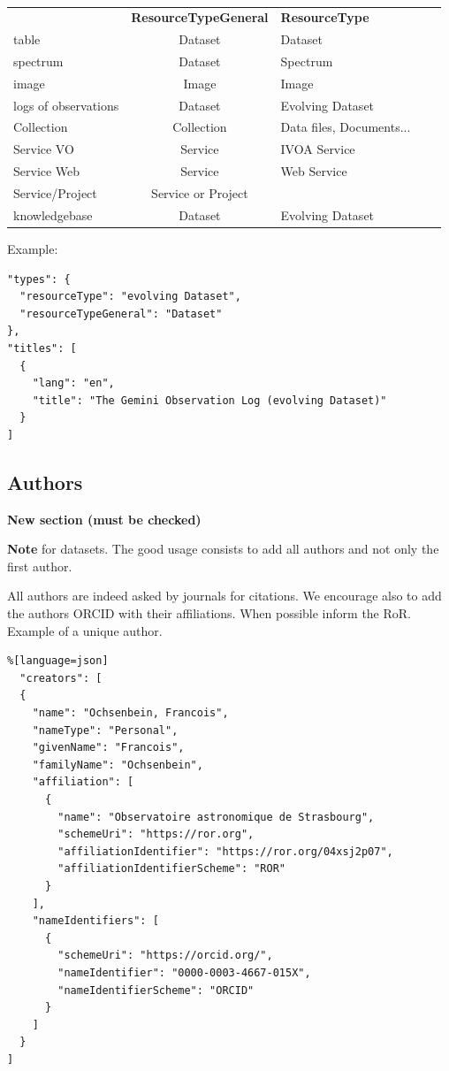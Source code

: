 \documentclass[11pt,a4paper]{ivoa}
\newcommand{\important}[1]{
	\begin{bigdescription}
		\item \color{ivoacolor}\textbf{Note} #1
	\end{bigdescription}
}
\begin{document}
\begin{table}[th]
\begin{tabular}{lclcr}
	\sptablerule
	 & \textbf{ResourceTypeGeneral} & \textbf{ResourceType}  \\
	\sptablerule
table         & Dataset             & Dataset          \\
spectrum      & Dataset             & Spectrum         \\
image         & Image               & Image            \\
logs of observations & Dataset      & Evolving Dataset \\
Collection    & Collection          & Data files, Documents... \\
Service VO    & Service             & IVOA Service     \\
Service Web   & Service             & Web Service      \\
Service/Project & Service or Project & \\
knowledgebase & Dataset             & Evolving Dataset \\  
\end{tabular}%
\caption{\label{tab:resourcetype}}
\end{table}

Example:

\begin{lstlisting}
"types": {
  "resourceType": "evolving Dataset",
  "resourceTypeGeneral": "Dataset"
},
"titles": [
  {
	"lang": "en",
	"title": "The Gemini Observation Log (evolving Dataset)"
  }
]
\end{lstlisting}

\subsection{Authors}\label{sec:authors}
\textbf{\color{red}New section (must be checked)}

\important{for datasets. The good usage consists to add all authors and not only the first author. }


All authors are indeed asked by journals for citations.
We encourage also to add the authors ORCID with their affiliations. When possible inform the RoR.\\

Example of a unique author.

\begin{lstlisting}%[language=json]
  "creators": [
  {
    "name": "Ochsenbein, Francois",
    "nameType": "Personal",
    "givenName": "Francois",
    "familyName": "Ochsenbein",
    "affiliation": [
      {
        "name": "Observatoire astronomique de Strasbourg",
        "schemeUri": "https://ror.org",
        "affiliationIdentifier": "https://ror.org/04xsj2p07",
        "affiliationIdentifierScheme": "ROR"
      }
    ],
    "nameIdentifiers": [
      {
        "schemeUri": "https://orcid.org/",
        "nameIdentifier": "0000-0003-4667-015X",
        "nameIdentifierScheme": "ORCID"
      }
    ]
  }
]
\end{lstlisting}
\end{document}
